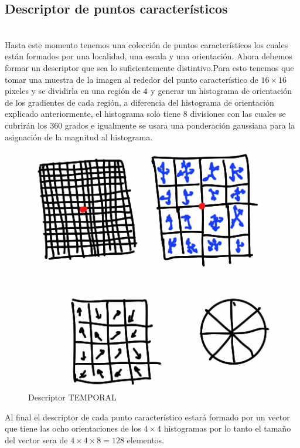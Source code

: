 	\subsection{Descriptor de puntos característicos} \hfill \\
	Hasta este momento tenemos una colección de puntos característicos los cuales están formados por una localidad, una escala y una orientación. Ahora debemos formar un descriptor que sea lo suficientemente distintivo.Para esto tenemos que tomar una muestra de la imagen al rededor del punto característico de $16\times16$ pixeles y se dividirla en una región de $4\time4$ y generar un histograma de orientación de los gradientes de cada región, a diferencia del histograma de orientación explicado anteriormente, el histograma solo tiene 8 divisiones con las cuales se cubrirán los 360 grados e igualmente se usara una ponderación gaussiana para la asignación de la magnitud al histograma.
		\begin{figure}[t]
			\centering
				\includegraphics[scale=0.5]{img/Descriptor.png}
			\caption{Descriptor TEMPORAL}
		\end{figure}
	Al final el descriptor de cada punto característico estará formado por un vector que tiene las ocho orientaciones de los $4\times4$ histogramas por lo tanto el tamaño del vector sera de $4\times4\times8 = 128$ elementos. 
 
 
 







